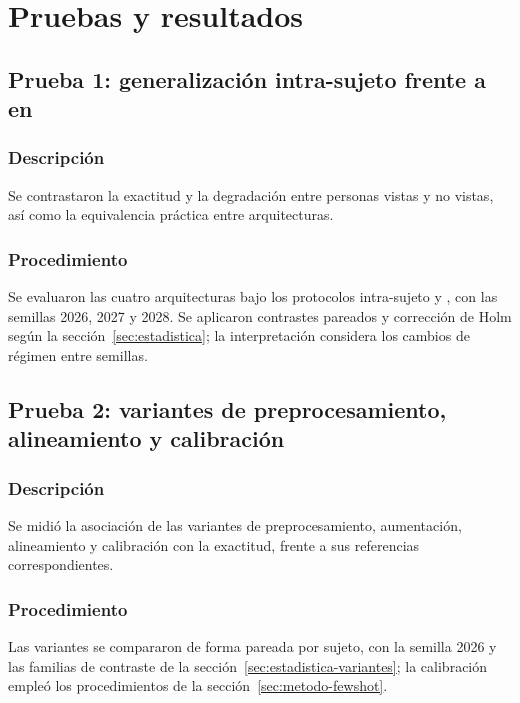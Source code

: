 \chapter{Pruebas y resultados}


\section{Prueba 1: generalización intra-sujeto frente a \loso{} en \openbmi{}}
\subsection{Descripción}
Se contrastaron la exactitud y la degradación entre personas vistas y no vistas, así como la equivalencia práctica entre arquitecturas.
\subsection{Procedimiento}
Se evaluaron las cuatro arquitecturas bajo los protocolos intra-sujeto y \loso{}, con las semillas 2026, 2027 y 2028. Se aplicaron contrastes pareados y corrección de Holm según la sección~\ref{sec:estadistica}; la interpretación considera los cambios de régimen entre semillas.






\section{Prueba 2: variantes de preprocesamiento, alineamiento y calibración}
\subsection{Descripción}
Se midió la asociación de las variantes de preprocesamiento, aumentación, alineamiento y calibración con la exactitud, frente a sus referencias correspondientes.
\subsection{Procedimiento}
Las variantes se compararon de forma pareada por sujeto, con la semilla 2026 y las familias de contraste de la sección~\ref{sec:estadistica-variantes}; la calibración empleó los procedimientos de la sección~\ref{sec:metodo-fewshot}.









